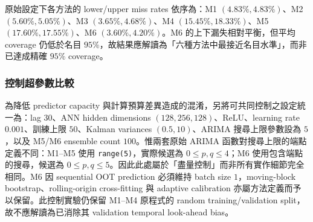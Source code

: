 \begin{table}[htbp]
\centering
\caption{M1M9--GARCH 模擬資料：原始超參數之 20 次 Monte Carlo 平均結果}
\label{tab:simulation-original}
\end{table}

原始設定下各方法的 lower/upper miss rates 依序為：M1 $(4.83\%,4.83\%)$、M2 $(5.60\%,5.05\%)$、M3 $(3.65\%,4.68\%)$、M4 $(15.45\%,18.33\%)$、M5 $(17.60\%,17.55\%)$、M6 $(3.60\%,4.20\%)$。M6 的上下漏失相對平衡，但平均 coverage 仍低於名目 $95\%$，故結果應解讀為「六種方法中最接近名目水準」，而非已達成精確 $95\%$ coverage。

\subsubsection{控制超參數比較}

為降低 predictor capacity 與計算預算差異造成的混淆，另將可共同控制之設定統一為：lag $30$、ANN hidden dimensions $(128,256,128)$、ReLU、learning rate $0.001$、訓練上限 $50$、Kalman variances $(0.5,10)$、ARIMA 搜尋上限參數設為 $5$，以及 M5/M6 ensemble count $100$。惟兩套原始 ARIMA 函數對搜尋上限的端點定義不同：M1--M5 使用 \texttt{range(5)}，實際候選為 $0\leq p,q\leq4$；M6 使用包含端點的搜尋，候選為 $0\leq p,q\leq5$。因此此處屬於「盡量控制」而非所有實作細節完全相同。M6 因 sequential OOT prediction 必須維持 batch size $1$，moving-block bootstrap、rolling-origin cross-fitting 與 adaptive calibration 亦屬方法定義而予以保留。此控制實驗仍保留 M1--M4 原程式的 random training/validation split，故不應解讀為已消除其 validation temporal look-ahead bias。

